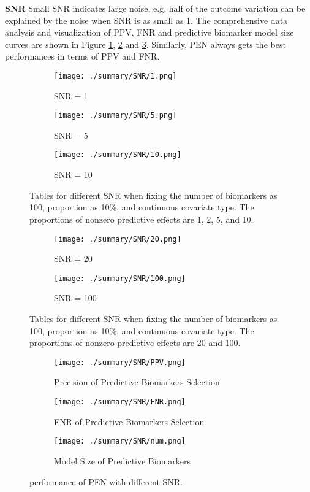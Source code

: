 \documentclass[12pt]{article}
\begin{document}
\textbf{SNR} Small SNR indicates large noise, e.g. half of the 
outcome variation can be explained by the noise when SNR is as small as 1.
The comprehensive data analysis and visualization of PPV, FNR and predictive
biomarker model size curves are shown in Figure \ref{SNR_table1},
\ref{SNR_table2} and \ref{SNR_fig}. Similarly, PEN always gets the best
performances in terms of PPV and FNR.

\begin{figure}[t]
  \begin{subfigure}{0.9\textwidth}
    \texttt{[image: ./summary/SNR/1.png]}
  \caption{SNR = 1}
\end{subfigure}
\begin{subfigure}{0.9\textwidth}
  \texttt{[image: ./summary/SNR/5.png]}
  \caption{SNR = 5}
\end{subfigure}
\begin{subfigure}{0.9\textwidth}
  \texttt{[image: ./summary/SNR/10.png]}
  \caption{SNR = 10}
\end{subfigure}
 \centering
  \caption{Tables for different SNR when fixing the number of biomarkers as 100, 
  proportion as 10\%, and continuous covariate type. The proportions of nonzero predictive effects are
  1, 2, 5, and 10. }
  \label{SNR_table1}
  \end{figure}

\begin{figure}[t]
\begin{subfigure}{0.9\textwidth}
    \texttt{[image: ./summary/SNR/20.png]}
    \caption{SNR = 20}
  \end{subfigure}
  \begin{subfigure}{0.9\textwidth}
      \texttt{[image: ./summary/SNR/100.png]}
      \caption{SNR = 100}
  \end{subfigure}
  \centering
  \caption{Tables for different SNR when fixing the number of biomarkers as 100, 
      proportion as 10\%, and continuous covariate type. The proportions of nonzero predictive effects are
      20 and 100. }
      \label{SNR_table2}
\end{figure}
  
  \begin{figure}[t]
    \begin{subfigure}{0.45\textwidth}
      \texttt{[image: ./summary/SNR/PPV.png]}
    \caption{Precision of Predictive Biomarkers Selection}
  \end{subfigure}
  \begin{subfigure}{0.45\textwidth}
    \texttt{[image: ./summary/SNR/FNR.png]}
    \caption{FNR of Predictive Biomarkers Selection}
  \end{subfigure}
  \begin{subfigure}{0.45\textwidth}
    \texttt{[image: ./summary/SNR/num.png]}
    \caption{Model Size of Predictive Biomarkers}
  \end{subfigure}
    \centering
    \caption{performance of PEN with different SNR.
    }
    \label{SNR_fig}
\end{figure}
\end{document}
